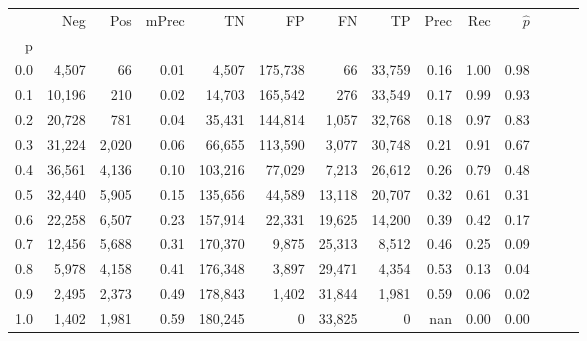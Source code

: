 \begin{tabular}{rrrrrrrrrrrrrr}
\toprule
{} &     Neg &    Pos & mPrec &       TN &       FP &      FN &      TP &  Prec &   Rec & $\hat{p}$ \\
p   &         &        &       &          &          &         &         &       &       &           \\
\midrule
0.0 &   4,507 &     66 &  0.01 &    4,507 &  175,738 &      66 &  33,759 &  0.16 &  1.00 &      0.98 \\
0.1 &  10,196 &    210 &  0.02 &   14,703 &  165,542 &     276 &  33,549 &  0.17 &  0.99 &      0.93 \\
0.2 &  20,728 &    781 &  0.04 &   35,431 &  144,814 &   1,057 &  32,768 &  0.18 &  0.97 &      0.83 \\
0.3 &  31,224 &  2,020 &  0.06 &   66,655 &  113,590 &   3,077 &  30,748 &  0.21 &  0.91 &      0.67 \\
0.4 &  36,561 &  4,136 &  0.10 &  103,216 &   77,029 &   7,213 &  26,612 &  0.26 &  0.79 &      0.48 \\
0.5 &  32,440 &  5,905 &  0.15 &  135,656 &   44,589 &  13,118 &  20,707 &  0.32 &  0.61 &      0.31 \\
0.6 &  22,258 &  6,507 &  0.23 &  157,914 &   22,331 &  19,625 &  14,200 &  0.39 &  0.42 &      0.17 \\
0.7 &  12,456 &  5,688 &  0.31 &  170,370 &    9,875 &  25,313 &   8,512 &  0.46 &  0.25 &      0.09 \\
0.8 &   5,978 &  4,158 &  0.41 &  176,348 &    3,897 &  29,471 &   4,354 &  0.53 &  0.13 &      0.04 \\
0.9 &   2,495 &  2,373 &  0.49 &  178,843 &    1,402 &  31,844 &   1,981 &  0.59 &  0.06 &      0.02 \\
1.0 &   1,402 &  1,981 &  0.59 &  180,245 &        0 &  33,825 &       0 &   nan &  0.00 &      0.00 \\
\bottomrule
\end{tabular}
